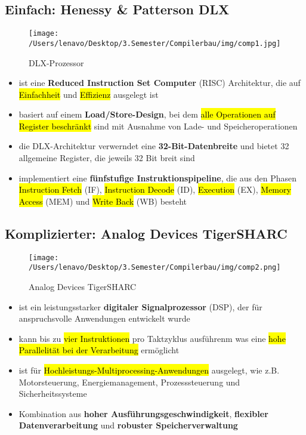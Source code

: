 \documentclass[a4paper, 10pt]{article}
\begin{document}
\subsection{Einfach: Henessy \& Patterson DLX}
\begin{figure}[h]
    \centering
    \texttt{[image: /Users/lenavo/Desktop/3.Semester/Compilerbau/img/comp1.jpg]}
    \caption{DLX-Prozessor}
    \label{fig:enter-label}
\end{figure}
\begin{itemize}
    \item ist eine \textbf{Reduced Instruction Set Computer} (RISC) Architektur, die auf \hl{Einfachheit} und \hl{Effizienz} ausgelegt ist
    \item basiert auf einem \textbf{Load/Store-Design}, bei dem \hl{alle Operationen auf Register beschränkt} sind mit Ausnahme von Lade- und Speicheroperationen
    \item die DLX-Architektur verwerndet eine \textbf{32-Bit-Datenbreite} und bietet 32 allgemeine Register, die jeweils 32 Bit breit sind
    \item implementiert eine \textbf{fünfstufige Instruktionspipeline}, die aus den Phasen \hl{Instruction Fetch} (IF), \hl{Instruction Decode} (ID), \hl{Execution} (EX), \hl{Memory Access} (MEM) und \hl{Write Back} (WB) besteht
\end{itemize}
\subsection{Komplizierter: Analog Devices TigerSHARC}

\begin{figure}[h]
    \centering
    \texttt{[image: /Users/lenavo/Desktop/3.Semester/Compilerbau/img/comp2.png]}
    \caption{Analog Devices TigerSHARC}
    \label{fig:enter-label}
\end{figure}
\begin{itemize}
    \item ist ein leistungsstarker \textbf{digitaler Signalprozessor} (DSP), der für anspruchsvolle Anwendungen entwickelt wurde
    \item kann bis zu \hl{vier Instruktionen} pro Taktzyklus ausführenm was eine \hl{hohe Parallelität bei der Verarbeitung} ermöglicht
    \item  ist für \hl{Hochleistungs-Multiprocessing-Anwendungen} ausgelegt, wie z.B. Motorsteuerung, Energiemanagement, Prozesssteuerung und Sicherheitssysteme
    \item Kombination aus \textbf{hoher Ausführungsgeschwindigkeit}, \textbf{flexibler Datenverarbeitung} und \textbf{robuster Speicherverwaltung}
\end{itemize}
\end{document}
